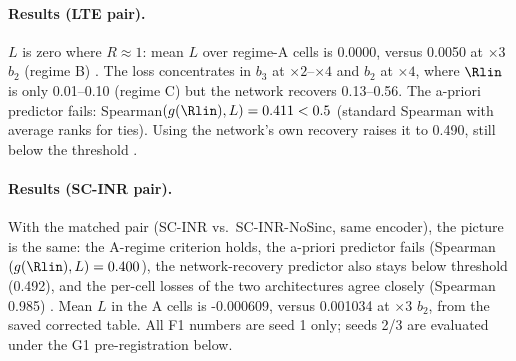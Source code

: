 \paragraph{Results (LTE pair).} $L$ is zero where $R\approx1$: mean $L$ over
regime-A cells is 0.0000, versus 0.0050 at $\times3$ $b_2$ (regime B)
. The loss concentrates in $b_3$ at $\times2$--$\times4$
and $b_2$ at $\times4$, where $\Rlin$ is only 0.01--0.10 (regime C) but the
network recovers 0.13--0.56. The a-priori predictor fails:
Spearman$(g(\Rlin),L)=0.411<0.5$ (standard Spearman with average ranks for
ties). Using the network's own recovery raises it to 0.490, still below the
threshold .

\paragraph{Results (SC-INR pair).} With the matched pair (SC-INR vs.\
SC-INR-NoSinc, same encoder), the picture is the same: the A-regime criterion
holds, the a-priori predictor fails (Spearman$(g(\Rlin),L)=0.400$), the
network-recovery predictor also stays below threshold (0.492), and the
per-cell losses of the two architectures agree closely (Spearman 0.985)
\src{F1-corr2}. Mean $L$ in the A cells is -0.000609, versus 0.001034 at $\times3$ $b_2$, from the saved corrected table. All F1 numbers are seed 1 only; seeds 2/3
are evaluated under the G1 pre-registration below.


